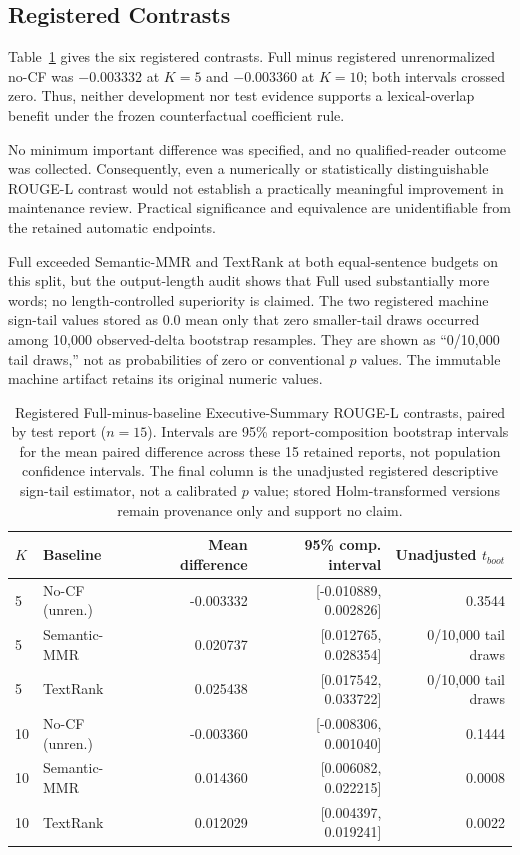 \documentclass[applsci,article,submit,moreauthors]{Definitions/mdpi}
\begin{document}
\subsection{Registered Contrasts}

Table~\ref{tab:contrasts} gives the six registered contrasts. Full minus registered unrenormalized no-CF was $-0.003332$ at $K=5$ and $-0.003360$ at $K=10$; both intervals crossed zero. Thus, neither development nor test evidence supports a lexical-overlap benefit under the frozen counterfactual coefficient rule.

No minimum important difference was specified, and no qualified-reader outcome was collected. Consequently, even a numerically or statistically distinguishable ROUGE-L contrast would not establish a practically meaningful improvement in maintenance review. Practical significance and equivalence are unidentifiable from the retained automatic endpoints.

Full exceeded Semantic-MMR and TextRank at both equal-sentence budgets on this split, but the output-length audit shows that Full used substantially more words; no length-controlled superiority is claimed. The two registered machine sign-tail values stored as 0.0 mean only that zero smaller-tail draws occurred among 10,000 observed-delta bootstrap resamples. They are shown as ``0/10,000 tail draws,'' not as probabilities of zero or conventional $p$ values. The immutable machine artifact retains its original numeric values.

\begin{table}[H]
\caption{Registered Full-minus-baseline Executive-Summary ROUGE-L contrasts, paired by test report ($n=15$). Intervals are 95\% report-composition bootstrap intervals for the mean paired difference across these 15 retained reports, not population confidence intervals. The final column is the unadjusted registered descriptive sign-tail estimator, not a calibrated $p$ value; stored Holm-transformed versions remain provenance only and support no claim.}
\label{tab:contrasts}\centering\small
\begin{tabular}{llrrr}
\toprule
$K$ & Baseline & Mean difference & 95\% comp. interval & Unadjusted $t_{boot}$\\
\midrule
5 & No-CF (unren.) & -0.003332 & [-0.010889, 0.002826] & 0.3544\\
5 & Semantic-MMR & 0.020737 & [0.012765, 0.028354] & 0/10,000 tail draws\\
5 & TextRank & 0.025438 & [0.017542, 0.033722] & 0/10,000 tail draws\\
10 & No-CF (unren.) & -0.003360 & [-0.008306, 0.001040] & 0.1444\\
10 & Semantic-MMR & 0.014360 & [0.006082, 0.022215] & 0.0008\\
10 & TextRank & 0.012029 & [0.004397, 0.019241] & 0.0022\\
\bottomrule
\end{tabular}
\end{table}
\end{document}
